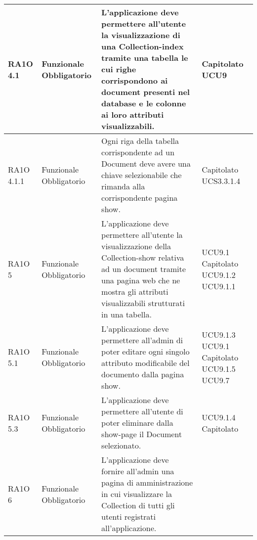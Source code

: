 \begin{center}
\begin{longtable}{ | l | p{2cm} | p{5cm} | p{1.7cm} |}
        RA1O 4.1  & Funzionale \newline  Obbligatorio  & L'applicazione deve permettere all'utente la visualizzazione di una Collection-index tramite una tabella le cui righe corrispondono ai document presenti nel database e le colonne ai loro attributi visualizzabili.  &  Capitolato \newline  UCU9 \newline  \\ \hline      
        RA1O 4.1.1  & Funzionale \newline  Obbligatorio  & Ogni riga della tabella corrispondente ad un Document deve avere una chiave selezionabile che rimanda alla corrispondente pagina show. &  Capitolato \newline  UCS3.3.1.4 \newline  \\ \hline      
        RA1O 5  & Funzionale \newline  Obbligatorio  & L'applicazione deve permettere all'utente la visualizzazione della Collection-show relativa ad un document tramite una pagina web che ne mostra gli attributi visualizzabili strutturati in una tabella.
 &  UCU9.1 \newline  Capitolato \newline  UCU9.1.2 \newline  UCU9.1.1 \newline  \\ \hline      
        RA1O 5.1 & Funzionale \newline  Obbligatorio  & L'applicazione deve permettere all'admin di poter editare ogni singolo attributo modificabile del documento dalla pagina show. &  UCU9.1.3 \newline  UCU9.1 \newline  Capitolato \newline  UCU9.1.5 \newline  UCU9.7 \newline  \\ \hline      
        RA1O 5.3 & Funzionale \newline  Obbligatorio  & L'applicazione deve permettere all'utente di poter eliminare dalla show-page il Document selezionato. &  UCU9.1.4 \newline  Capitolato \newline  \\ \hline      
        RA1O 6 & Funzionale \newline  Obbligatorio  & L'applicazione deve fornire all'admin una pagina di amministrazione in cui visualizzare la Collection di tutti gli utenti registrati all'applicazione.

\end{longtable}
\end{center}
